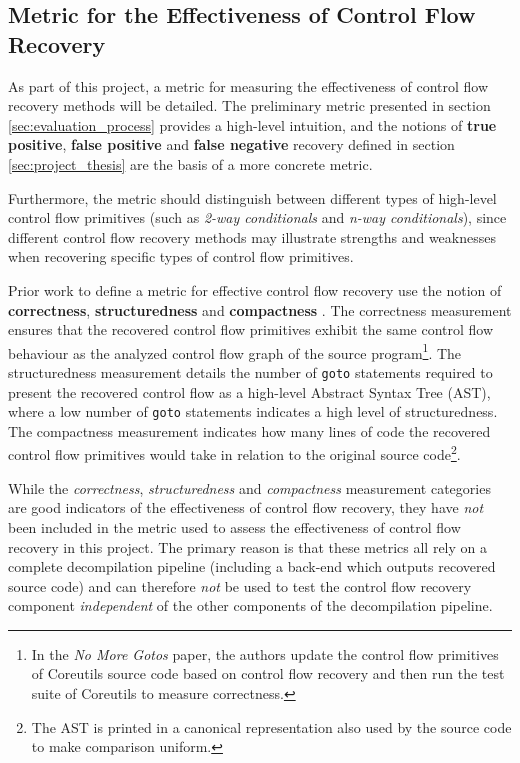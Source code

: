 
\subsection{Metric for the Effectiveness of Control Flow Recovery}
\label{sec:requirements_metric}

As part of this project, a metric for measuring the effectiveness of control flow recovery methods will be detailed. The preliminary metric presented in section \ref{sec:evaluation_process} provides a high-level intuition, and the notions of \textbf{true positive}, \textbf{false positive} and \textbf{false negative} recovery defined in section \ref{sec:project_thesis} are the basis of a more concrete metric.

Furthermore, the metric should distinguish between different types of high-level control flow primitives (such as \textit{2-way conditionals} and \textit{n-way conditionals}), since different control flow recovery methods may illustrate strengths and weaknesses when recovering specific types of control flow primitives.

Prior work to define a metric for effective control flow recovery use the notion of \textbf{correctness}, \textbf{structuredness} and \textbf{compactness} \cite{no_more_gotos}. The correctness measurement ensures that the recovered control flow primitives exhibit the same control flow behaviour as the analyzed control flow graph of the source program\footnote{In the \textit{No More Gotos} paper, the authors update the control flow primitives of Coreutils source code based on control flow recovery and then run the test suite of Coreutils to measure correctness.}. The structuredness measurement details the number of \texttt{goto} statements required to present the recovered control flow as a high-level Abstract Syntax Tree (AST), where a low number of \texttt{goto} statements indicates a high level of structuredness. The compactness measurement indicates how many lines of code the recovered control flow primitives would take in relation to the original source code\footnote{The AST is printed in a canonical representation also used by the source code to make comparison uniform.}.

While the \textit{correctness}, \textit{structuredness} and \textit{compactness} measurement categories are good indicators of the effectiveness of control flow recovery, they have \textit{not} been included in the metric used to assess the effectiveness of control flow recovery in this project. The primary reason is that these metrics all rely on a complete decompilation pipeline (including a back-end which outputs recovered source code) and can therefore \textit{not} be used to test the control flow recovery component \textit{independent} of the other components of the decompilation pipeline.

